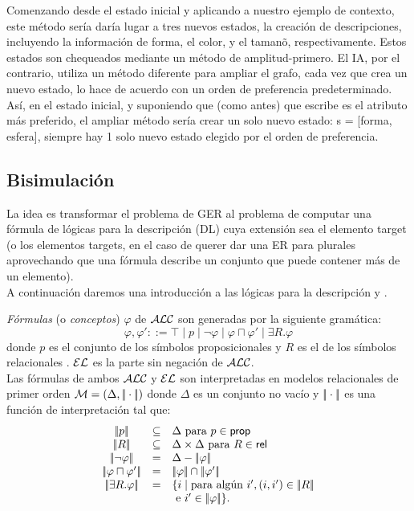 Comenzando desde el estado inicial y aplicando a nuestro ejemplo de contexto, este m\'etodo ser\'ia dar\'ia lugar a tres nuevos estados, la creaci\'on de descripciones, incluyendo la informaci\'on de forma, el color, y el taman\~o, respectivamente. Estos estados son chequeados mediante un m\'etodo de amplitud-primero. 
El IA, por el contrario, utiliza un m\'etodo diferente para ampliar el grafo, cada vez que crea
un nuevo estado, lo hace de acuerdo con un orden de preferencia predeterminado. As\'i, en
el estado inicial, y suponiendo que (como antes) que escribe es el atributo m\'as preferido, el
ampliar m\'etodo ser\'ia crear un solo nuevo estado: s = {[forma, esfera]}, siempre hay 1 solo nuevo estado elegido por el orden de preferencia.



\subsection{Bisimulaci\'on}
\label{bisimulacion}


La idea es transformar el problema de GER al problema de computar una f\'ormula de l\'ogicas para la descripci\'on (DL) cuya extensi\'on sea el elemento target (o los elementos targets, en el caso de querer dar una ER para plurales aprovechando que una f\'ormula describe un conjunto que puede contener m\'as de un elemento).\\

A continuaci\'on daremos una introducci\'on a las l\'ogicas para la descripci\'on \alc y \el.

\emph{F\'ormulas} (o \emph{conceptos}) $\varphi$ de $\mathcal{ALC}$ son generadas por la siguiente gram\'atica:
$$
\varphi,\varphi' ::= \top \mid p \mid \neg \varphi \mid \varphi \sqcap \varphi'
\mid \exists R. \varphi
$$
donde $p$ es el conjunto de los s\'imbolos proposicionales \prop y $R$ es el de los s\'imbolos relacionales \rel. $\mathcal{EL}$ es la parte sin negaci\'on de $\mathcal{ALC}$.\\

Las f\'ormulas de ambos $\mathcal{ALC}$ y $\mathcal{EL}$ son interpretadas en modelos relacionales de primer orden $\mathcal{M} = (\Delta,|\!|\cdot|\!|)$ donde
$\Delta$ es un conjunto no vac\'io y $|\!|\cdot|\!|$ es una funci\'on de interpretaci\'on tal que:
$$
\begin{array}{ccl}
\interp{p} & \subseteq & \Delta  \mbox{ para $p \in \prop$}\\
\interp{R} & \subseteq & \Delta \times \Delta  \mbox{ para $R \in \rel$}\\
\interp{\neg \varphi} & = & \Delta - \interp{\varphi}\\
\interp{\varphi \sqcap \varphi'} & = & \interp{\varphi} \cap \interp{\varphi'}\\
\interp{\exists R.\varphi} & = & \{i \mid \mbox{para alg\'un } i', (i,i') \in \interp{R}\\
& & \mbox{ e } i' \in \interp{\varphi} \}.\\
\end{array}
$$

